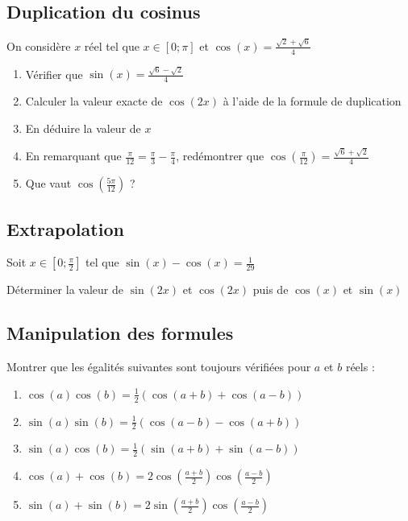 \documentclass[oneside,12pt]{article}          %
\begin{document}
\subsection{Duplication du cosinus}
On considère $x$ réel tel que $x\in [0;\pi]$ et $\cos(x)=\frac{\sqrt{2}+\sqrt{6}}{4}$ 
\begin{enumerate}
    \item Vérifier que $\sin(x)=\frac{\sqrt{6}-\sqrt{2}}{4}$
    \item Calculer la valeur exacte de $\cos(2x)$ à l'aide de la formule de duplication
    \item En déduire la valeur de $x$
    \item En remarquant que $\frac{\pi}{12}=\frac{\pi}{3}-\frac{\pi}{4}$, redémontrer que $\cos\left(\frac{\pi}{12}\right)=\frac{\sqrt{6}+\sqrt{2}}{4}$
    \item Que vaut $\cos\left(\frac{5\pi}{12}\right)$ ?
\end{enumerate}



\subsection{Extrapolation}
Soit $x\in\left[0;\frac{\pi}{2}\right]$ tel que $\sin(x)-\cos(x)=\frac{1}{29}$

Déterminer la valeur de $\sin(2x)$ et $\cos(2x)$ puis de $\cos(x)$ et $\sin(x)$




\subsection{Manipulation des formules}
Montrer que les égalités suivantes sont toujours vérifiées pour $a$ et $b$ réels :
\begin{enumerate}
	\item $\cos(a)\cos(b)=\frac{1}{2}\left(\cos(a+b)+\cos(a-b)\right)$
	\item $\sin(a)\sin(b)=\frac{1}{2}\left(\cos(a-b)-\cos(a+b)\right)$
	\item $\sin(a)\cos(b)=\frac{1}{2}\left(\sin(a+b)+\sin(a-b)\right)$
	\item $\cos(a)+\cos(b)=2\cos\left(\frac{a+b}{2}\right)\cos\left(\frac{a-b}{2}\right)$
	\item $\sin(a)+\sin(b)=2\sin\left(\frac{a+b}{2}\right)\cos\left(\frac{a-b}{2}\right)$
\end{enumerate}
\end{document}
